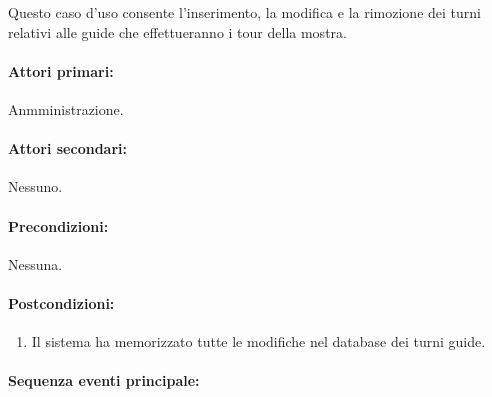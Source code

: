 \documentclass{article}
\begin{document}
\indent\indent Questo caso d'uso consente l’inserimento, la modifica e la rimozione dei turni relativi alle guide che effettueranno i tour della mostra.
	
	\paragraph{Attori primari:}Anmministrazione.
	
	\paragraph{Attori secondari:}Nessuno.
	
	\paragraph{Precondizioni:}Nessuna.
	
	\paragraph{Postcondizioni:}
\begin{enumerate}	[leftmargin=28pt]
\item Il sistema ha memorizzato tutte le modifiche nel database dei turni guide.
\end{enumerate}
	
	\paragraph{Sequenza eventi principale:}
\end{document}
